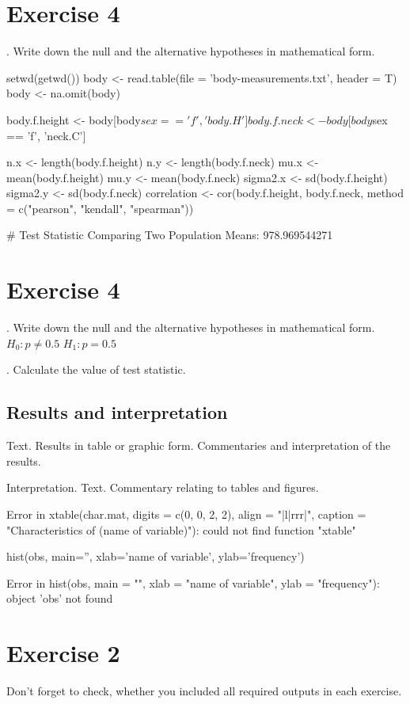 \documentclass[12pt, oneside]{report}\usepackage[]{graphicx}\usepackage[]{color}
\begin{document}
\section*{Exercise 4}
. Write down the null and the alternative hypotheses in mathematical form. \newline
\begin{Schunk}
\begin{Sinput}
setwd(getwd())
body <- read.table(file = 'body-measurements.txt', header = T)
body <- na.omit(body)

body.f.height <- body[body$sex == 'f', 'body.H']
body.f.neck <- body[body$sex == 'f', 'neck.C']

n.x <- length(body.f.height)
n.y <- length(body.f.neck)
mu.x <- mean(body.f.height)
mu.y <- mean(body.f.neck)
sigma2.x <- sd(body.f.height)
sigma2.y <- sd(body.f.neck)
correlation <- cor(body.f.height, body.f.neck, method = c("pearson", "kendall", "spearman"))

# Test Statistic Comparing Two Population Means: 978.969544271
\end{Sinput}
\end{Schunk}

\section*{Exercise 4}
. Write down the null and the alternative hypotheses in mathematical form. \newline
$H_0: p \neq 0.5 $ \newline
$H_1: p = 0.5$ \newline

. Calculate the value of test statistic. \newline


\bigskip

\subsection*{Results and interpretation}
\noindent Text. Results in table or graphic form. Commentaries and interpretation of the results.

Interpretation. Text. Commentary relating to tables and figures. 

Error in xtable(char.mat, digits = c(0, 0, 2, 2), align = "|l|rrr|", caption = "Characteristics of (name of variable)"): could not find function "xtable"


\begin{Schunk}
\begin{Sinput}
hist(obs, main='', xlab='name of variable', ylab='frequency')
\end{Sinput}
\begin{Soutput}
Error in hist(obs, main = "", xlab = "name of variable", ylab = "frequency"): object 'obs' not found
\end{Soutput}
\end{Schunk}


\newpage

\section*{Exercise 2}
\noindent Don't forget to check, whether you included all required outputs in each exercise.
\end{document}
